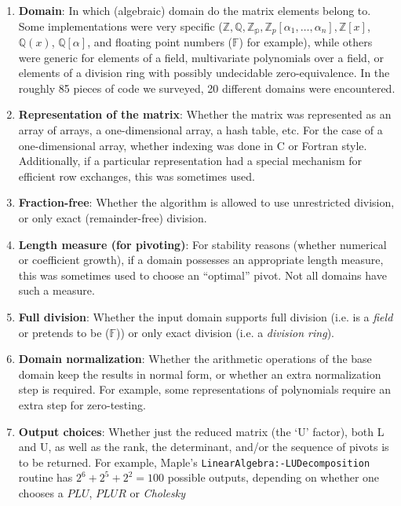 \documentclass[draft]{elsart}
\newcommand{\floats}{\mathbb{F}}
\begin{document}
\begin{enumerate}
	\item \textbf{Domain}: In which (algebraic) domain do the matrix
		elements belong to.  Some implementations were very specific
		($\mathbb{Z}, \mathbb{Q}, \mathbb{Z_p}, 
		\mathbb{Z}_p\left[\alpha_1,\ldots,\alpha_n\right], 
		\mathbb{Z}\left[x\right]$, $\mathbb{Q}\left(x\right)$, 
		$\mathbb{Q}\left[\alpha\right]$, and floating point numbers 
		($\floats$) for 
		example), while others were generic for elements of a field,
		multivariate polynomials over a field, or elements of a division ring
		with possibly undecidable zero-equivalence.  In the roughly 85 pieces
		of code we surveyed, 20 different domains were encountered.
	\item \textbf{Representation of the matrix}: Whether the matrix
		was represented as an array of arrays, a one-dimensional array,
		a hash table, etc.  For the case of a one-dimensional array,
		whether indexing was done in C or Fortran style.  Additionally,
		if a particular representation had a special mechanism for efficient
		row exchanges, this was sometimes used.
	\item \textbf{Fraction-free}: Whether the 
		algorithm is allowed to use unrestricted division, or only
		exact (remainder-free) division.
	\item \textbf{Length measure (for pivoting)}:  For stability reasons
		(whether numerical or coefficient growth), if a domain possesses
		an appropriate length measure, this was sometimes used to choose
		an ``optimal'' pivot.  Not all domains have such a measure.
	\item \textbf{Full division}: Whether the input domain supports full
		division (i.e. is a \emph{field} or pretends to be ($\floats$)) 
		or only exact division (i.e. a \emph{division ring}).
	\item \textbf{Domain normalization}: Whether the arithmetic operations
		of the base domain keep the results in normal form, or whether
		an extra normalization step is required.  For example, some 
		representations of polynomials require an extra step for
		zero-testing.
	\item \textbf{Output choices}:  Whether just the reduced matrix
		(the `U' factor), both L and U, as well as
		the rank, the determinant, and/or the sequence of 
		pivots is to be returned.  For example, Maple's
		\texttt{LinearAlgebra:-LUDecomposition} routine has
		$2^6 + 2^5 + 2^2 = 100$ possible outputs, depending on whether
		one chooses a $PLU$, $PLUR$ or \emph{Cholesky} 

\end{enumerate}
\end{document}
